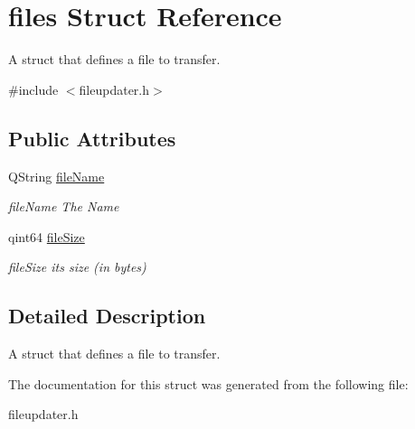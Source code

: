 \hypertarget{structfiles}{}\section{files Struct Reference}
\label{structfiles}


A struct that defines a file to transfer.  




{\ttfamily \#include $<$fileupdater.\+h$>$}

\subsection*{Public Attributes}
\begin{DoxyCompactItemize}
\item 
\mbox{\label{structfiles_a1ab1fb7a65ff4f8689b896502c15598b}} 
Q\+String \mbox{\hyperlink{structfiles_a1ab1fb7a65ff4f8689b896502c15598b}{file\+Name}}
\begin{DoxyCompactList}\small\item\em file\+Name The Name \end{DoxyCompactList}\item 
\mbox{\label{structfiles_a0b8b2e19ef7841029f27c6dc02ecddaf}} 
qint64 \mbox{\hyperlink{structfiles_a0b8b2e19ef7841029f27c6dc02ecddaf}{file\+Size}}
\begin{DoxyCompactList}\small\item\em file\+Size its size (in bytes) \end{DoxyCompactList}\end{DoxyCompactItemize}


\subsection{Detailed Description}
A struct that defines a file to transfer. 

The documentation for this struct was generated from the following file\+:\begin{DoxyCompactItemize}
\item 
fileupdater.\+h\end{DoxyCompactItemize}
